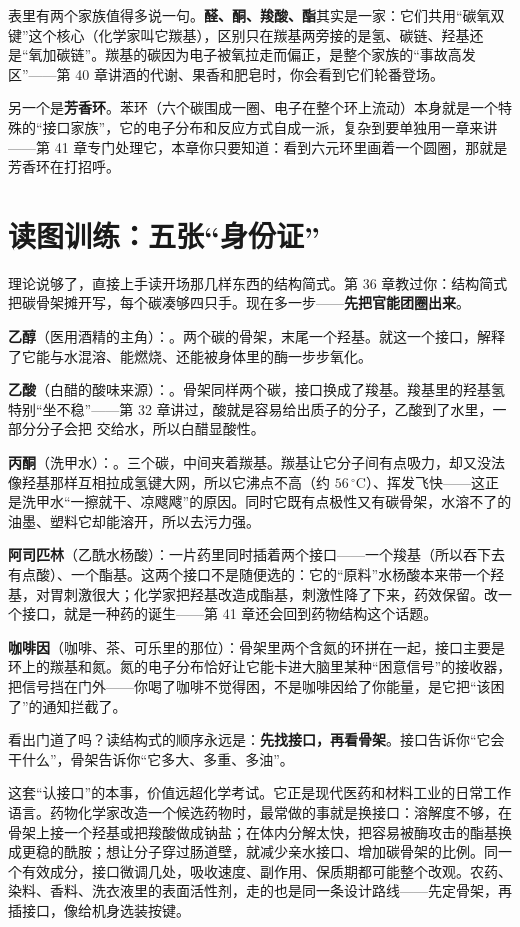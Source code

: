 表里有两个家族值得多说一句。\textbf{醛、酮、羧酸、酯}其实是一家：它们共用“碳氧双键”这个核心（化学家叫它羰基），区别只在羰基两旁接的是氢、碳链、羟基还是“氧加碳链”。羰基的碳因为电子被氧拉走而偏正，是整个家族的“事故高发区”——第 40 章讲酒的代谢、果香和肥皂时，你会看到它们轮番登场。

另一个是\textbf{芳香环}。苯环（六个碳围成一圈、电子在整个环上流动）本身就是一个特殊的“接口家族”，它的电子分布和反应方式自成一派，复杂到要单独用一章来讲——第 41 章专门处理它，本章你只要知道：看到六元环里画着一个圆圈，那就是芳香环在打招呼。

\section{读图训练：五张“身份证”}

理论说够了，直接上手读开场那几样东西的结构简式。第 36 章教过你：结构简式把碳骨架摊开写，每个碳凑够四只手。现在多一步——\textbf{先把官能团圈出来}。

\textbf{乙醇}（医用酒精的主角）：。两个碳的骨架，末尾一个羟基。就这一个接口，解释了它能与水混溶、能燃烧、还能被身体里的酶一步步氧化。

\textbf{乙酸}（白醋的酸味来源）：。骨架同样两个碳，接口换成了羧基。羧基里的羟基氢特别“坐不稳”——第 32 章讲过，酸就是容易给出质子的分子，乙酸到了水里，一部分分子会把  交给水，所以白醋显酸性。

\textbf{丙酮}（洗甲水）：。三个碳，中间夹着羰基。羰基让它分子间有点吸力，却又没法像羟基那样互相拉成氢键大网，所以它沸点不高（约 $56\,^{\circ}\mathrm{C}$）、挥发飞快——这正是洗甲水“一擦就干、凉飕飕”的原因。同时它既有点极性又有碳骨架，水溶不了的油墨、塑料它却能溶开，所以去污力强。

\textbf{阿司匹林}（乙酰水杨酸）：一片药里同时插着两个接口——一个羧基（所以吞下去有点酸）、一个酯基。这两个接口不是随便选的：它的“原料”水杨酸本来带一个羟基，对胃刺激很大；化学家把羟基改造成酯基，刺激性降了下来，药效保留。改一个接口，就是一种药的诞生——第 41 章还会回到药物结构这个话题。

\textbf{咖啡因}（咖啡、茶、可乐里的那位）：骨架里两个含氮的环拼在一起，接口主要是环上的羰基和氮。氮的电子分布恰好让它能卡进大脑里某种“困意信号”的接收器，把信号挡在门外——你喝了咖啡不觉得困，不是咖啡因给了你能量，是它把“该困了”的通知拦截了。

看出门道了吗？读结构式的顺序永远是：\textbf{先找接口，再看骨架}。接口告诉你“它会干什么”，骨架告诉你“它多大、多重、多油”。

这套“认接口”的本事，价值远超化学考试。它正是现代医药和材料工业的日常工作语言。药物化学家改造一个候选药物时，最常做的事就是换接口：溶解度不够，在骨架上接一个羟基或把羧酸做成钠盐；在体内分解太快，把容易被酶攻击的酯基换成更稳的酰胺；想让分子穿过肠道壁，就减少亲水接口、增加碳骨架的比例。同一个有效成分，接口微调几处，吸收速度、副作用、保质期都可能整个改观。农药、染料、香料、洗衣液里的表面活性剂，走的也是同一条设计路线——先定骨架，再插接口，像给机身选装按键。

